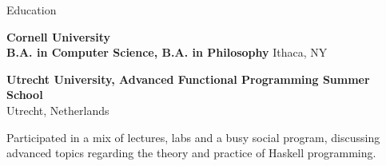 
\begin{rSection}{Education}

	{\bf \large{Cornell University}} \hfill \color{darkgray}{2021 - 2025}
	\\ 
	\textbf{B.A. in Computer Science, B.A. in Philosophy} \hfill Ithaca, NY
	
	\color{black}

	{\textbf{\large{Utrecht University, Advanced Functional Programming Summer School}} \hfill \color{darkgray}{07/2023} 
	\\ \vspace*{1mm}
	 \hfill{Utrecht, Netherlands} 
	\\ 
	\color{black}
	\begin{minipage}{40em}
			 Participated in a mix of lectures, labs and a busy social program, discussing advanced topics regarding the theory and practice of Haskell programming.
	\end{minipage}}

\end{rSection}